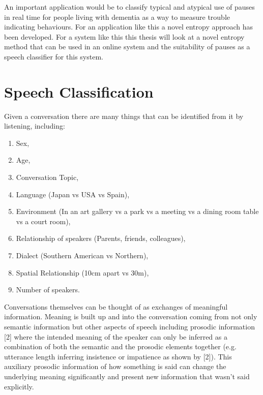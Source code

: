 An important application would be to classify typical and atypical use of pauses in real time for people living with dementia as a way to measure trouble indicating behaviours. For an application like this a novel entropy approach has been developed. For a system like this this thesis will look at a novel entropy method that can be used in an online system and the suitability of pauses as a speech classifier for this system. \\




\section{Speech Classification}
Given a conversation there are many things that can be identified from it by listening, including:

\begin{enumerate}
	\item Sex,
	\item Age,
	\item Conversation Topic,
	\item Language (Japan vs USA vs Spain),
	\item Environment (In an art gallery vs a park vs a meeting vs a dining room table vs a court room),
	\item Relationship of speakers (Parents, friends, colleagues),
	\item Dialect (Southern American vs Northern),
	\item Spatial Relationship (10cm apart vs 30m),
	\item Number of speakers.
\end{enumerate}

Conversations themselves can be thought of as exchanges of meaningful information. Meaning is built up and into the conversation coming from not only semantic information but other aspects of speech including prosodic information [2] where the intended meaning of the speaker can only be inferred as a combination of both the semantic and the prosodic elements together (e.g. utterance length inferring insistence or impatience as shown by [2]). This auxiliary prosodic information of how something is said can change the underlying meaning significantly and present new information that wasn't said explicitly. \\


